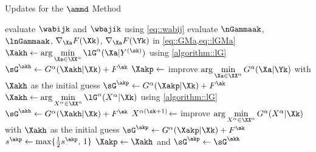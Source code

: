 \begin{algorithm}[t]
	\caption{Updates for the $\ammd$ Method}
	\label{algorithm::amm_x}
	\begin{algorithmic}[1]
		\State evaluate $\wabijk$ and $\wbajik$ using \cref{eq::wabij} \label{line::alg6::wabij}
		\vspace{0.1em}
				\State  evaluate $\nGammaak$, $\lnGammaak$, $\nabla_{\Xa} F(\Xk)$, $\nabla_{\Xa} F(\Yk)$ in \cref{eq::GMa,eq::lGMa} \label{line::alg6::DFak}
		\vspace{0.1em}
		\State $\Xakh\gets\arg\min\limits_{\Xa\in\XX^\alpha }\lG^\alpha(\Xa|Y^{(\sk)})$ using \cref{algorithm::lG}\label{line::alg6::Xakh1}
		\State $\sG^{\akh}\gets G^\alpha(\Xakh|\Xk) + F^{\ak}$\label{line::alg6::Gakh1}
		\vspace{0.1em}
		\State $\Xakp\gets$ improve $\arg\min\limits_{\Xa\in\XX^\alpha }G^\alpha(\Xa|\Yk)$ with $\Xakh$ as the initial guess\label{line::alg6::Xakp1}
		\vspace{0.1em}
		\State $\sG^{\akp}\gets G^\alpha(\Xakp|\Xk) + F^{\ak} $ \label{line::alg6::Gakp1}
		\vspace{0.1em}
		\label{line::alg6::lGX1}\label{line::alg6::restart1}
		\vspace{0.1em}
		\State$\Xakh\gets\arg\min\limits_{X^\alpha\in\XX^\alpha }\lG^\alpha(X^\alpha|\Xk)$\label{line::alg6::Xkh} using \cref{algorithm::lG}\label{line::alg6::Xakh2}
		\vspace{0.1em}
		\State $\sG^{\akh}\gets G^\alpha(\Xakh|\Xk) + F^{\ak}$\label{line::alg6::Gakh2}
		\vspace{0.1em}
		\EndIf\label{line::alg6::restart2}
		\vspace{0.1em}
		\If{$\sG^{\akp} > \sF^{\ak}$}\label{line::alg6::restart3}
		\vspace{0.1em}
		\State $X^{\alpha(\sk+1)}\!\gets$ improve $\arg\min\limits_{X^\alpha\in\XX^\alpha }G^\alpha(X^\alpha|\Xk)$ with $\Xakh$ as the initial guess\label{line::alg6::Xakp2}
		\vspace{0.1em}
		\State $\sG^{\akp}\gets G^\alpha(\Xakp|\Xk) + F^{\ak}$\label{line::alg6::Gakp2}
		\vspace{0.1em}
		\State $s^{\akp}\gets \max\{\tfrac{1}{2}s^{\akp},\,1\}$
		\vspace{0.1em}
		\EndIf\label{line::alg6::restart4}
		\vspace{0.1em}
		\If{$\lF^{\ak}-\sG^{\akp} < \phi\cdot\Big(\lF^{\ak}-\sG^{\akh}\Big)$}\label{line::alg6::check1}
		\State $\Xakp \gets \Xakh$ and $\sG^{\akp}\gets\sG^{\akh}$\label{line::alg6::Xakp3}
		\EndIf\label{line::alg6::check2}
	\end{algorithmic}
\end{algorithm}